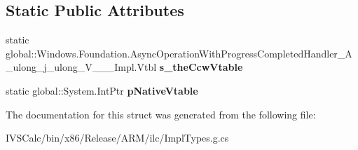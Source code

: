 \subsection*{Static Public Attributes}
\begin{DoxyCompactItemize}
\item 
\mbox{\label{struct_windows_1_1_foundation_1_1_async_operation_with_progress_completed_handler___a__ulong__j__ulong___v_______impl_1_1_vtbl_adede0cc7a911e56d6f489b47166c858b}} 
static global\+::\+Windows.\+Foundation.\+Async\+Operation\+With\+Progress\+Completed\+Handler\+\_\+\+A\+\_\+ulong\+\_\+j\+\_\+ulong\+\_\+\+V\+\_\+\+\_\+\+\_\+\+Impl.\+Vtbl {\bfseries s\+\_\+the\+Ccw\+Vtable}
\item 
\mbox{\label{struct_windows_1_1_foundation_1_1_async_operation_with_progress_completed_handler___a__ulong__j__ulong___v_______impl_1_1_vtbl_a13fba3b4edbe711263f3bf54f20edb91}} 
static global\+::\+System.\+Int\+Ptr {\bfseries p\+Native\+Vtable}
\end{DoxyCompactItemize}


The documentation for this struct was generated from the following file\+:\begin{DoxyCompactItemize}
\item 
I\+V\+S\+Calc/bin/x86/\+Release/\+A\+R\+M/ilc/Impl\+Types.\+g.\+cs\end{DoxyCompactItemize}
